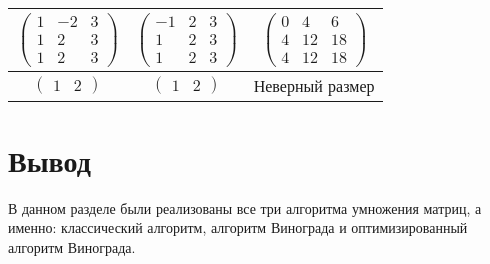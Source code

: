 \begin{table}[H]
\begin{center}
\begin{tabular}{|c|c|c|}
			$\begin{pmatrix}
				1 & -2 & 3\\
				1 & 2 & 3\\
				1 & 2 & 3
			\end{pmatrix}$ &
			$\begin{pmatrix}
				-1 & 2 & 3\\
				1 & 2 & 3\\
				1 & 2 & 3
			\end{pmatrix}$ &
			$\begin{pmatrix}
				0 & 4 & 6\\
				4 & 12 & 18\\
				4 & 12 & 18
			\end{pmatrix}$\\
			\hline

			$\begin{pmatrix}
				1 & 2
			\end{pmatrix}$ &
			$\begin{pmatrix}
				1 & 2
			\end{pmatrix}$ &
			Неверный размер\\
			\hline
		\end{tabular}
	\end{center}
	
\end{table}

\section*{Вывод}
В данном разделе были реализованы все три алгоритма умножения матриц, а именно: классический алгоритм, алгоритм Винограда и оптимизированный алгоритм Винограда.